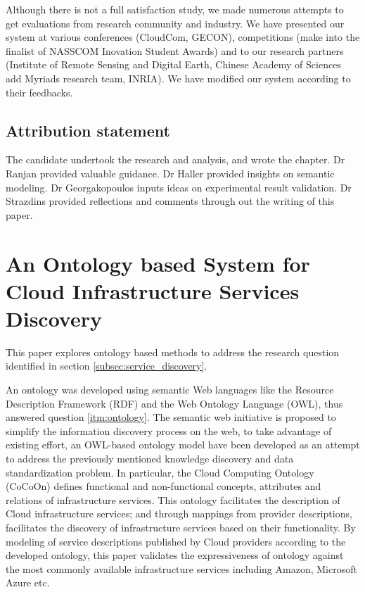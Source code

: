 Although there is not a full satisfaction study, we made numerous attempts to 
get evaluations from research community and industry. We have presented our system 
at various conferences (CloudCom, GECON), competitions
(make into the finalist of NASSCOM Inovation Student Awards) and to our research
partners (Institute of Remote Sensing and Digital Earth, Chinese Academy of Sciences add
Myriads research team, INRIA). We have modified our system according to their
feedbacks. 

\subsection{Attribution statement}
The candidate undertook the research and analysis, and wrote the chapter. 
Dr Ranjan provided valuable guidance. Dr Haller provided insights on semantic modeling. 
Dr Georgakopoulos inputs ideas on experimental result validation. 
Dr Strazdins provided reflections and comments through out the writing of this paper.

\section{An Ontology based System for Cloud Infrastructure Services Discovery}
\label{paper:ontology}
This paper explores ontology based methods to address the research question identified 
in section \ref{subsec:service_discovery}. 

An ontology was developed using semantic Web languages like the Resource Description Framework (RDF) and the Web Ontology Language (OWL), thus answered question \ref{itm:ontology}.
The semantic web initiative is proposed to simplify the information discovery process on the web, to take advantage of existing effort, an OWL-based ontology model have been developed as an attempt to address the previously mentioned knowledge discovery and data standardization problem. In particular, the Cloud Computing Ontology (CoCoOn) defines functional and non-functional concepts, attributes and relations of infrastructure services. This ontology facilitates the description of Cloud infrastructure services; and through mappings from provider descriptions, facilitates the discovery of infrastructure services based on their functionality.
By modeling of service descriptions published by Cloud providers according to the developed ontology, this paper validates the expressiveness of ontology against the most commonly available infrastructure services including Amazon, Microsoft Azure etc.

